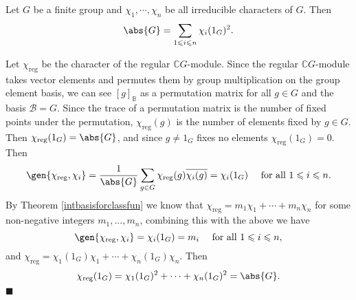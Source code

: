 \documentclass[../Project.tex]{subfiles}
\begin{document}
\begin{prop}[{\cite[page 25]{3}}]
	Let $G$ be a finite group and $\chi_1,\cdots,\chi_n$ be all irreducible characters of $G$. Then
	$$\abs{G} = \sum_{1 \leqslant i \leqslant n}\chi_i(1_G)^2.$$
	\label{sumdegsquared}
\end{prop}
\begin{proo*}[{\cite[page 25]{3}}]
	Let $\chi_\text{reg}$ be the character of the regular $\mathbb{C}G$-module. Since the regular $\mathbb{C}G$-module takes vector elements and permutes them by group multiplication on the group element basis, we can see $[g]_\mathbb{B}$ as a permutation matrix for all $g \in G$ and the basis $\mathcal{B} = G$. Since the trace of a permutation matrix is the number of fixed points under the permutation, $\chi_\text{reg}(g)$ is the number of elements fixed by $g \in G$. Then $\chi_\text{reg}(1_G) = \abs{G}$, and since $g \neq 1_G$ fixes no elements $\chi_\text{reg}(1_G) = 0$. Then
	$$\gen{\chi_\text{reg},\chi_i} = \frac{1}{\abs{G}}\sum_{g \in G}\chi_\text{reg}(g)\overline{\chi_i(g)} = \chi_i(1_G) \quad \text{ for all } 1 \leqslant i \leqslant n.$$
	By Theorem \ref{intbasisforclassfun} we know that $\chi_\text{reg} = m_1\chi_1 + \cdots + m_n\chi_n$ for some non-negative integers $m_1,\dots,m_n$, combining this with the above we have
	$$\gen{\chi_\text{reg},\chi_i} = \chi_i(1_G) = m_i \quad \text{ for all } 1 \leqslant i \leqslant n,$$
	and $\chi_\text{reg} = \chi_1(1_G)\chi_1 + \cdots +\chi_n(1_G)\chi_n$. Then $$\chi_\text{reg}(1_G) = \chi_1(1_G)^2 + \cdots + \chi_n(1_G)^2 = \abs{G}.$$
	\hfill$\blacksquare$
\end{proo*}
\end{document}
